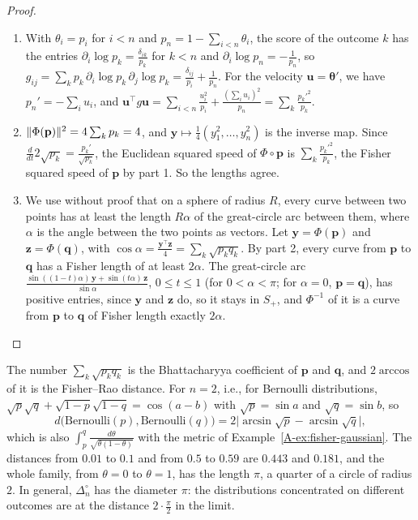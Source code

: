 \begin{proof}
    \begin{enumerate}
        \item With $\theta_i = p_i$ for $i < n$ and $p_n = 1 - \sum_{i<n}\theta_i$, the score of the outcome $k$ has the entries $\partial_i\log p_k = \frac{\delta_{ik}}{p_k}$ for $k < n$ and $\partial_i\log p_n = -\frac{1}{p_n}$, so $g_{ij} = \sum_k p_k\,\partial_i\log p_k\,\partial_j\log p_k = \frac{\delta_{ij}}{p_i} + \frac{1}{p_n}$. For the velocity $\mathbf{u} = \boldsymbol{\theta}'$, we have $p_n' = -\sum_i u_i$, and $\mathbf{u}^\top g\mathbf{u} = \sum_{i<n}\frac{u_i^2}{p_i} + \frac{(\sum_i u_i)^2}{p_n} = \sum_k \frac{p_k'^2}{p_k}$.
        \item $\lVert \Phi(\mathbf{p}) \rVert^2 = 4\sum_k p_k = 4$, and $\mathbf{y} \mapsto \frac{1}{4}(y_1^2, \ldots, y_n^2)$ is the inverse map. Since $\frac{d}{dt}2\sqrt{p_k} = \frac{p_k'}{\sqrt{p_k}}$, the Euclidean squared speed of $\Phi \circ \mathbf{p}$ is $\sum_k \frac{p_k'^2}{p_k}$, the Fisher squared speed of $\mathbf{p}$ by part 1. So the lengths agree.
        \item We use without proof that on a sphere of radius $R$, every curve between two points has at least the length $R\alpha$ of the great-circle arc between them, where $\alpha$ is the angle between the two points as vectors. Let $\mathbf{y} = \Phi(\mathbf{p})$ and $\mathbf{z} = \Phi(\mathbf{q})$, with $\cos\alpha = \frac{\mathbf{y}^\top\mathbf{z}}{4} = \sum_k\sqrt{p_kq_k}$. By part 2, every curve from $\mathbf{p}$ to $\mathbf{q}$ has a Fisher length of at least $2\alpha$. The great-circle arc $\frac{\sin((1 - t)\alpha)\,\mathbf{y} + \sin(t\alpha)\,\mathbf{z}}{\sin\alpha}$, $0 \leq t \leq 1$ (for $0 < \alpha < \pi$; for $\alpha = 0$, $\mathbf{p} = \mathbf{q}$), has positive entries, since $\mathbf{y}$ and $\mathbf{z}$ do, so it stays in $S_+$, and $\Phi^{-1}$ of it is a curve from $\mathbf{p}$ to $\mathbf{q}$ of Fisher length exactly $2\alpha$. \qedhere
    \end{enumerate}
\end{proof}

The number $\sum_k \sqrt{p_kq_k}$ is the Bhattacharyya coefficient of $\mathbf{p}$ and $\mathbf{q}$, and $2\arccos$ of it is the Fisher--Rao distance. For $n = 2$, i.e., for Bernoulli distributions, $\sqrt{p}\sqrt{q} + \sqrt{1 - p}\sqrt{1 - q} = \cos(a - b)$ with $\sqrt{p} = \sin a$ and $\sqrt{q} = \sin b$, so
\[d\big(\text{Bernoulli}(p), \text{Bernoulli}(q)\big) = 2\big|\arcsin\sqrt{p} - \arcsin\sqrt{q}\big|,\]
which is also $\int_p^q \frac{d\theta}{\sqrt{\theta(1 - \theta)}}$ with the metric of Example~\ref{A-ex:fisher-gaussian}. The distances from $0.01$ to $0.1$ and from $0.5$ to $0.59$ are $0.443$ and $0.181$, and the whole family, from $\theta = 0$ to $\theta = 1$, has the length $\pi$, a quarter of a circle of radius $2$. In general, $\Delta_n^\circ$ has the diameter $\pi$: the distributions concentrated on different outcomes are at the distance $2 \cdot \frac{\pi}{2}$ in the limit.


